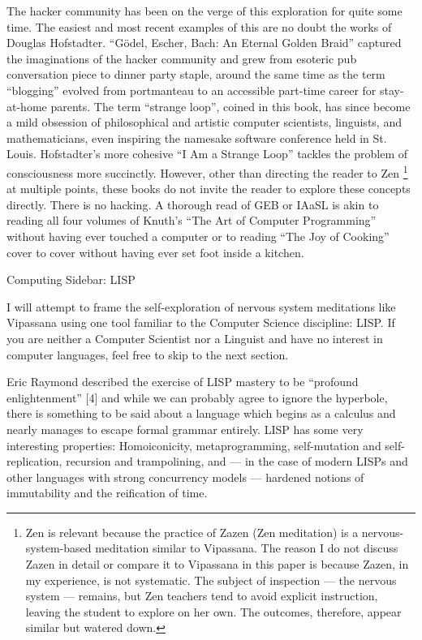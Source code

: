 \documentclass{article}
\begin{document}
The hacker community has been on the verge of this exploration for quite some time. The easiest and most recent examples of this are no doubt the works of Douglas Hofstadter. ``Gödel, Escher, Bach: An Eternal Golden Braid'' captured the imaginations of the hacker community and grew from esoteric pub conversation piece to dinner party staple, around the same time as the term ``blogging'' evolved from portmanteau to an accessible part-time career for stay-at-home parents. The term ``strange loop'', coined in this book, has since become a mild obsession of philosophical and artistic computer scientists, linguists, and mathematicians, even inspiring the namesake software conference held in St. Louis. Hofstadter's more cohesive ``I Am a Strange Loop'' tackles the problem of consciousness more succinctly. However, other than directing the reader to Zen \footnote{Zen is relevant because the practice of Zazen (Zen meditation) is a nervous-system-based meditation similar to Vipassana. The reason I do not discuss Zazen in detail or compare it to Vipassana in this paper is because Zazen, in my experience, is not systematic. The subject of inspection — the nervous system — remains, but Zen teachers tend to avoid explicit instruction, leaving the student to explore on her own. The outcomes, therefore, appear similar but watered down.} at multiple points, these books do not invite the reader to explore these concepts directly. There is no hacking. A thorough read of GEB or IAaSL is akin to reading all four volumes of Knuth's ``The Art of Computer Programming'' without having ever touched a computer or to reading ``The Joy of Cooking'' cover to cover without having ever set foot inside a kitchen.

\pagebreak

\begin{center}
  \Huge{Computing Sidebar: LISP}
\end{center}

I will attempt to frame the self-exploration of nervous system meditations like Vipassana using one tool familiar to the Computer Science discipline: LISP. If you are neither a Computer Scientist nor a Linguist and have no interest in computer languages, feel free to skip to the next section.

Eric Raymond described the exercise of LISP mastery to be ``profound enlightenment'' [4] and while we can probably agree to ignore the hyperbole, there is something to be said about a language which begins as a calculus and nearly manages to escape formal grammar entirely. LISP has some very interesting properties: Homoiconicity, metaprogramming, self-mutation and self-replication, recursion and trampolining, and — in the case of modern LISPs and other languages with strong concurrency models — hardened notions of immutability and the reification of time.
\end{document}

